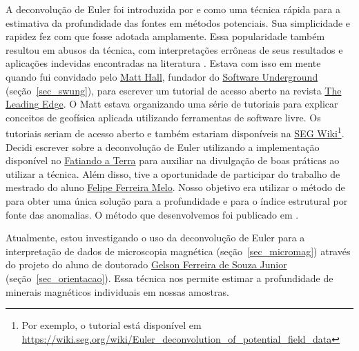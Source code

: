 \documentclass[12pt,a4paper,oneside]{book}
\newcommand{\GelsonLink}{\href{https://www.compgeolab.org/team/\#Souza-junior}{Gelson Ferreira de Souza Junior}}
\newcommand{\SwungLink}{\href{https://softwareunderground.org/}{Software Underground}}
\newcommand{\FatiandoLink}{\href{https://www.fatiando.org}{Fatiando a Terra}}
\begin{document}
A deconvolução de Euler foi introduzida por \citet{Thompson1982} e
\citet{Reid1990} como uma técnica rápida para a estimativa da profundidade das
fontes em métodos potenciais.
Sua simplicidade e rapidez fez com que fosse adotada amplamente. Essa
popularidade também resultou em abusos da técnica, com interpretações errôneas
de seus resultados e aplicações indevidas encontradas na literatura
\citep{Reid2014}.
Estava com isso em mente quando fui convidado pelo
\href{https://github.com/kwinkunks}{Matt Hall}, fundador do
\SwungLink{} (seção~\ref{sec_swung}), para escrever um tutorial de acesso
aberto na revista \href{https://library.seg.org/loi/leedff}{The Leading Edge}.
O Matt estava organizando uma série de tutoriais para explicar conceitos de
geofísica aplicada utilizando ferramentas de software livre.
Os tutoriais seriam de acesso aberto e também estariam disponíveis na
\href{https://wiki.seg.org/wiki/Main_Page}{SEG Wiki}\footnote{Por exemplo, o
tutorial \citet{Uieda2014} está disponível em
\url{https://wiki.seg.org/wiki/Euler_deconvolution_of_potential_field_data}}.
Decidi escrever sobre a deconvolução de Euler utilizando a implementação
disponível no \FatiandoLink{} para auxiliar na divulgação de boas práticas
ao utilizar a técnica.
Além disso, tive a oportunidade de participar do trabalho de mestrado do aluno
\href{https://www.pinga-lab.org/people/melo.html}{Felipe Ferreira Melo}.
Nosso objetivo era utilizar o método de \citet{Barbosa1999} para obter uma
única solução para a profundidade e para o índice estrutural por fonte das
anomalias.
O método que desenvolvemos foi publicado em \citet{Melo2013}.

Atualmente, estou investigando o uso da deconvolução de Euler para a
interpretação de dados de microscopia magnética (seção~\ref{sec_micromag})
através do projeto do aluno de doutorado \GelsonLink{}
(seção~\ref{sec_orientacao}).
Essa técnica nos permite estimar a profundidade de minerais magnéticos
individuais em nossas amostras.
\end{document}
